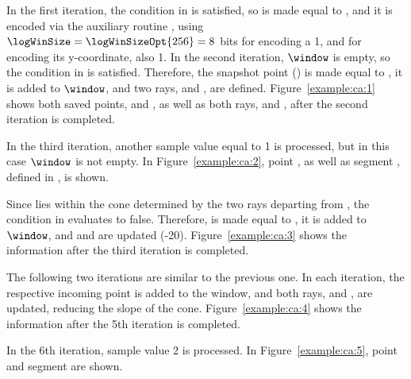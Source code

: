 In the first iteration, the condition in  is satisfied, so \archived is made equal to , and it is encoded via the auxiliary routine \CAWinStart, using $\logWinSize = \logWinSizeOpt{256}=8$ bits for encoding a 1, and \tobitexp for encoding its y-coordinate, also 1. In the second iteration, $\window$ is empty, so the condition in  is satisfied. Therefore, the snapshot point (\snapshot) is made equal to , it is added to $\window$, and two rays, \smin and \smax, are defined. Figure~\ref{example:ca:1} shows both saved points, \archived and \snapshot, as well as both rays, \smin and \smax, after the second iteration is completed.


\vspace{+3pt}


In the third iteration, another sample value equal to 1 is processed, but in this case $\window$ is not empty. In Figure~\ref{example:ca:2}, point , as well as segment , defined in , is shown.


\vspace{+3pt}


\clearpage


Since  lies within the cone determined by the two rays departing from \archived, the condition in  evaluates to false. Therefore, \snapshot is made equal to , it is added to $\window$, and \smin and \smax are updated (-20). Figure~\ref{example:ca:3} shows the information after the third iteration is completed.


\vspace{+5pt}


The following two iterations are similar to the previous one. In each iteration, the respective incoming point is added to the window, and both rays, \smin and \smax, are updated, reducing the slope of the cone. Figure~\ref{example:ca:4} shows the information after the 5th iteration is completed.


\vspace{+5pt}


\clearpage


In the 6th iteration, sample value 2 is processed. In Figure~\ref{example:ca:5}, point  and segment  are shown.




